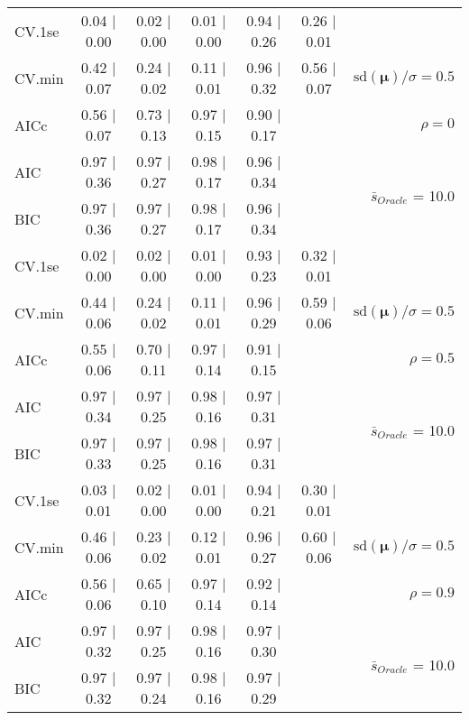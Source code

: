 \begin{table}
\begin{center}
\begin{tabular}{l*{5}{c}|r}
 \hline 
CV.1se & 0.04 $\mid$ 0.00 & 0.02 $\mid$ 0.00 & 0.01 $\mid$ 0.00 & 0.94 $\mid$ 0.26 & 0.26 $\mid$ 0.01 & \\
CV.min & 0.42 $\mid$ 0.07 & 0.24 $\mid$ 0.02 & 0.11 $\mid$ 0.01 & 0.96 $\mid$ 0.32 & 0.56 $\mid$ 0.07 &  $\mathrm{sd}(\mathbf{\mu})/\sigma=0.5$ \\
AICc & 0.56 $\mid$ 0.07 & 0.73 $\mid$ 0.13 & 0.97 $\mid$ 0.15 & 0.90 $\mid$ 0.17 & & $\rho=0$ \\
AIC & 0.97 $\mid$ 0.36 & 0.97 $\mid$ 0.27 & 0.98 $\mid$ 0.17 & 0.96 $\mid$ 0.34 & &  \multirow{2}{*}{$\bar{s}_{Oracle}$ = 10.0} \\
BIC & 0.97 $\mid$ 0.36 & 0.97 $\mid$ 0.27 & 0.98 $\mid$ 0.17 & 0.96 $\mid$ 0.34 & &  \\
 \hline 
CV.1se & 0.02 $\mid$ 0.00 & 0.02 $\mid$ 0.00 & 0.01 $\mid$ 0.00 & 0.93 $\mid$ 0.23 & 0.32 $\mid$ 0.01 & \\
CV.min & 0.44 $\mid$ 0.06 & 0.24 $\mid$ 0.02 & 0.11 $\mid$ 0.01 & 0.96 $\mid$ 0.29 & 0.59 $\mid$ 0.06 &  $\mathrm{sd}(\mathbf{\mu})/\sigma=0.5$ \\
AICc & 0.55 $\mid$ 0.06 & 0.70 $\mid$ 0.11 & 0.97 $\mid$ 0.14 & 0.91 $\mid$ 0.15 & & $\rho=0.5$ \\
AIC & 0.97 $\mid$ 0.34 & 0.97 $\mid$ 0.25 & 0.98 $\mid$ 0.16 & 0.97 $\mid$ 0.31 & &  \multirow{2}{*}{$\bar{s}_{Oracle}$ = 10.0} \\
BIC & 0.97 $\mid$ 0.33 & 0.97 $\mid$ 0.25 & 0.98 $\mid$ 0.16 & 0.97 $\mid$ 0.31 & &  \\
 \hline 
CV.1se & 0.03 $\mid$ 0.01 & 0.02 $\mid$ 0.00 & 0.01 $\mid$ 0.00 & 0.94 $\mid$ 0.21 & 0.30 $\mid$ 0.01 & \\
CV.min & 0.46 $\mid$ 0.06 & 0.23 $\mid$ 0.02 & 0.12 $\mid$ 0.01 & 0.96 $\mid$ 0.27 & 0.60 $\mid$ 0.06 &  $\mathrm{sd}(\mathbf{\mu})/\sigma=0.5$ \\
AICc & 0.56 $\mid$ 0.06 & 0.65 $\mid$ 0.10 & 0.97 $\mid$ 0.14 & 0.92 $\mid$ 0.14 & & $\rho=0.9$ \\
AIC & 0.97 $\mid$ 0.32 & 0.97 $\mid$ 0.25 & 0.98 $\mid$ 0.16 & 0.97 $\mid$ 0.30 & &  \multirow{2}{*}{$\bar{s}_{Oracle}$ = 10.0} \\
BIC & 0.97 $\mid$ 0.32 & 0.97 $\mid$ 0.24 & 0.98 $\mid$ 0.16 & 0.97 $\mid$ 0.29 & &  \\
 \hline 
\end{tabular}
\end{center}
\vspace{-1cm}
\end{table}




